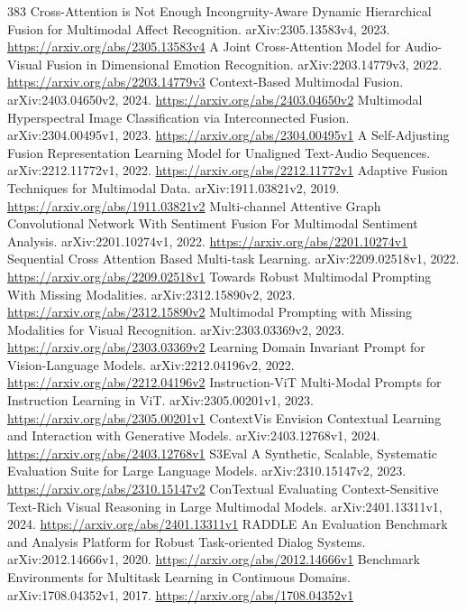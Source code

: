 \documentclass[11pt]{article}
\begin{document}
\begin{thebibliography}{383}
 Cross-Attention is Not Enough Incongruity-Aware Dynamic Hierarchical Fusion for Multimodal Affect Recognition. arXiv:2305.13583v4, 2023. \url{https://arxiv.org/abs/2305.13583v4}
 A Joint Cross-Attention Model for Audio-Visual Fusion in Dimensional Emotion Recognition. arXiv:2203.14779v3, 2022. \url{https://arxiv.org/abs/2203.14779v3}
 Context-Based Multimodal Fusion. arXiv:2403.04650v2, 2024. \url{https://arxiv.org/abs/2403.04650v2}
 Multimodal Hyperspectral Image Classification via Interconnected Fusion. arXiv:2304.00495v1, 2023. \url{https://arxiv.org/abs/2304.00495v1}
 A Self-Adjusting Fusion Representation Learning Model for Unaligned Text-Audio Sequences. arXiv:2212.11772v1, 2022. \url{https://arxiv.org/abs/2212.11772v1}
 Adaptive Fusion Techniques for Multimodal Data. arXiv:1911.03821v2, 2019. \url{https://arxiv.org/abs/1911.03821v2}
 Multi-channel Attentive Graph Convolutional Network With Sentiment Fusion For Multimodal Sentiment Analysis. arXiv:2201.10274v1, 2022. \url{https://arxiv.org/abs/2201.10274v1}
 Sequential Cross Attention Based Multi-task Learning. arXiv:2209.02518v1, 2022. \url{https://arxiv.org/abs/2209.02518v1}
 Towards Robust Multimodal Prompting With Missing Modalities. arXiv:2312.15890v2, 2023. \url{https://arxiv.org/abs/2312.15890v2}
 Multimodal Prompting with Missing Modalities for Visual Recognition. arXiv:2303.03369v2, 2023. \url{https://arxiv.org/abs/2303.03369v2}
 Learning Domain Invariant Prompt for Vision-Language Models. arXiv:2212.04196v2, 2022. \url{https://arxiv.org/abs/2212.04196v2}
 Instruction-ViT Multi-Modal Prompts for Instruction Learning in ViT. arXiv:2305.00201v1, 2023. \url{https://arxiv.org/abs/2305.00201v1}
 ContextVis Envision Contextual Learning and Interaction with Generative Models. arXiv:2403.12768v1, 2024. \url{https://arxiv.org/abs/2403.12768v1}
 S3Eval A Synthetic, Scalable, Systematic Evaluation Suite for Large Language Models. arXiv:2310.15147v2, 2023. \url{https://arxiv.org/abs/2310.15147v2}
 ConTextual Evaluating Context-Sensitive Text-Rich Visual Reasoning in Large Multimodal Models. arXiv:2401.13311v1, 2024. \url{https://arxiv.org/abs/2401.13311v1}
 RADDLE An Evaluation Benchmark and Analysis Platform for Robust Task-oriented Dialog Systems. arXiv:2012.14666v1, 2020. \url{https://arxiv.org/abs/2012.14666v1}
 Benchmark Environments for Multitask Learning in Continuous Domains. arXiv:1708.04352v1, 2017. \url{https://arxiv.org/abs/1708.04352v1}

\end{thebibliography}
\end{document}
